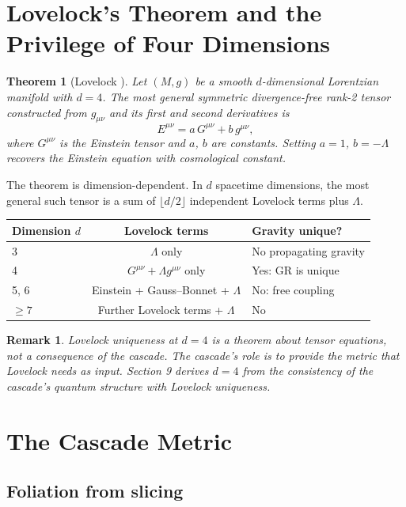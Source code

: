 \documentclass[12pt,a4paper]{article}
\newtheorem{theorem}{Theorem}[section]
\newtheorem*{remark}{Remark}
\begin{document}
\section{Lovelock's Theorem and the Privilege of Four Dimensions}

\begin{theorem}[Lovelock {\cite{lovelock1,lovelock2}}]
Let $(M, g)$ be a smooth $d$-dimensional Lorentzian manifold
with $d = 4$. The most general symmetric divergence-free rank-2 tensor constructed from
$g_{\mu\nu}$ and its first and second derivatives is
\[
E^{\mu\nu} = a\,G^{\mu\nu} + b\,g^{\mu\nu},
\]
where $G^{\mu\nu}$ is the Einstein tensor and $a$, $b$ are constants. Setting $a = 1$, $b = -\Lambda$ recovers
the Einstein equation with cosmological constant.
\end{theorem}

The theorem is dimension-dependent. In $d$ spacetime dimensions, the most general
such tensor is a sum of $\lfloor d/2 \rfloor$ independent Lovelock terms plus $\Lambda$.

\begin{center}
\begin{tabular}{lcl}
\hline
Dimension $d$ & Lovelock terms & Gravity unique? \\
\hline
3 & $\Lambda$ only & No propagating gravity \\
4 & $G^{\mu\nu} + \Lambda g^{\mu\nu}$ only & Yes: GR is unique \\
5, 6 & Einstein + Gauss--Bonnet + $\Lambda$ & No: free coupling \\
$\geq 7$ & Further Lovelock terms + $\Lambda$ & No \\
\hline
\end{tabular}
\end{center}

\begin{remark}
Lovelock uniqueness at $d = 4$ is a theorem about tensor equations, not a
consequence of the cascade. The cascade's role is to provide the metric that Lovelock needs
as input. Section 9 derives $d = 4$ from the consistency of the cascade's quantum structure
with Lovelock uniqueness.
\end{remark}

\section{The Cascade Metric}

\subsection{Foliation from slicing}
\end{document}
